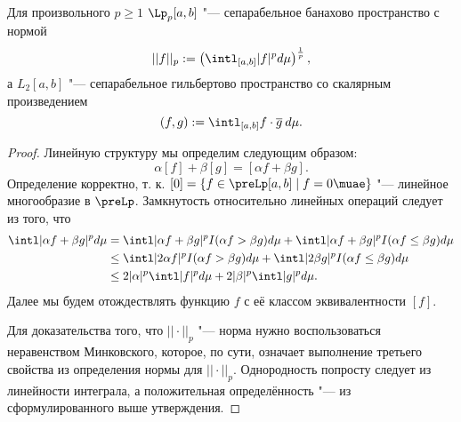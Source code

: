 \documentclass[main]{subfiles}
\begin{document}
\begin{theorem} %
  Для произвольного \( p \ge 1 \)
  \( \Lp_p[a, b] \) "--- сепарабельное
  банахово пространство с нормой
  \[
    ||f||_p := \left( \intl_{[a,b]} |f|^p d\mu \right)^{\frac1p},
  \]
  а $L_2[a, b]$ "--- сепарабельное гильбертово пространство
  со скалярным произведением
  \[
    (f, g) := \intl_{[a,b]} f \cdot \overline{g} \: d\mu.
  \]
\end{theorem}
\begin{proof}
  Линейную структуру  мы определим
  следующим образом:
  \[ \alpha [f] + \beta [g] = [\alpha f + \beta g]. \]
  Определение корректно, т. к.
  \( [0] = \{ f \in \preLp[a, b] \mid f = 0 \muae \} \) "---
  линейное многообразие в \( \preLp \).
  Замкнутость относительно линейных операций
  следует из того, что
  \begin{align}
    \intl |\alpha f + \beta g|^p d\mu &=
    \intl |\alpha f + \beta g|^p I(\alpha f >  \beta g) d\mu +
    \intl |\alpha f + \beta g|^p I(\alpha f \le \beta g) d\mu \\
    &\le
    \intl |2 \alpha f|^p I(\alpha f > \beta g) d\mu +
    \intl |2 \beta g|^p I(\alpha f \le \beta g) d\mu \\
    &\le
    2 |\alpha|^p \intl |f|^p d\mu +
    2 |\beta|^p \intl |g|^p d\mu.
  \end{align}
  Далее мы будем отождествлять функцию
  \( f \) с её классом эквивалентности \( [f] \).

  Для доказательства того,
  что \( ||\cdot||_p \) "--- норма
  нужно воспользоваться неравенством Минковского,
  которое, по сути, означает выполнение
  третьего свойства из определения нормы для \( ||\cdot||_p \).
  Однородность попросту следует из линейности интеграла,
  а положительная определённость "---
  из сформулированного выше утверждения.


\end{proof}
\end{document}
